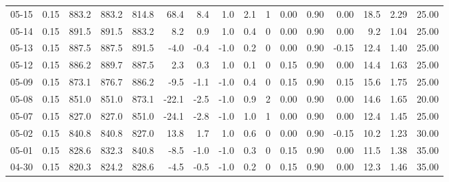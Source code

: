 \begin{threeparttable}
{\begin{tabular}{lrrrrrrrrrrrrrrr}
  05-15 &     0.15 & 883.2 & 883.2 & 814.8 &       68.4 &            8.4 &                      1.0 &                 2.1 &              1 &       0.00 &      0.90 &           0.00 &             18.5 &            2.29 &                  25.00 \\
  05-14 &     0.15 & 891.5 & 891.5 & 883.2 &        8.2 &            0.9 &                      1.0 &                 0.4 &              0 &       0.00 &      0.90 &           0.00 &              9.2 &            1.04 &                  25.00 \\
  05-13 &     0.15 & 887.5 & 887.5 & 891.5 &       -4.0 &           -0.4 &                     -1.0 &                 0.2 &              0 &       0.00 &      0.90 &          -0.15 &             12.4 &            1.40 &                  25.00 \\
  05-12 &     0.15 & 886.2 & 889.7 & 887.5 &        2.3 &            0.3 &                      1.0 &                 0.1 &              0 &       0.15 &      0.90 &           0.00 &             14.4 &            1.63 &                  25.00 \\
  05-09 &     0.15 & 873.1 & 876.7 & 886.2 &       -9.5 &           -1.1 &                     -1.0 &                 0.4 &              0 &       0.15 &      0.90 &           0.15 &             15.6 &            1.75 &                  25.00 \\
  05-08 &     0.15 & 851.0 & 851.0 & 873.1 &      -22.1 &           -2.5 &                     -1.0 &                 0.9 &              2 &       0.00 &      0.90 &           0.00 &             14.6 &            1.65 &                  20.00 \\
  05-07 &     0.15 & 827.0 & 827.0 & 851.0 &      -24.1 &           -2.8 &                     -1.0 &                 1.0 &              1 &       0.00 &      0.90 &           0.00 &             12.4 &            1.45 &                  25.00 \\
  05-02 &     0.15 & 840.8 & 840.8 & 827.0 &       13.8 &            1.7 &                      1.0 &                 0.6 &              0 &       0.00 &      0.90 &          -0.15 &             10.2 &            1.23 &                  30.00 \\
  05-01 &     0.15 & 828.6 & 832.3 & 840.8 &       -8.5 &           -1.0 &                     -1.0 &                 0.3 &              0 &       0.15 &      0.90 &           0.00 &             11.5 &            1.38 &                  35.00 \\
  04-30 &     0.15 & 820.3 & 824.2 & 828.6 &       -4.5 &           -0.5 &                     -1.0 &                 0.2 &              0 &       0.15 &      0.90 &           0.00 &             12.3 &            1.46 &                  35.00 \\

\end{tabular}}
\end{threeparttable}
